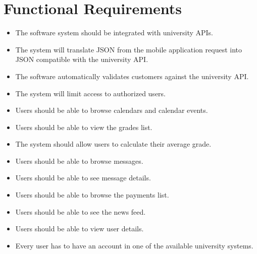 \section{Functional Requirements}
\begin{itemize}
    \item The software system should be integrated with university APIs.
    \item The system will translate JSON from the mobile application request into JSON compatible with the university API.
    \item The software automatically validates customers against the university API.
    \item The system will limit access to authorized users.
    \item Users should be able to browse calendars and calendar events.
    \item Users should be able to view the grades list.
    \item The system should allow users to calculate their average grade.
    \item Users should be able to browse messages.
    \item Users should be able to see message details.
    \item Users should be able to browse the payments list.
    \item Users should be able to see the news feed.
    \item Users should be able to view user details.
    \item Every user has to have an account in one of the available university systems.
\end{itemize}

